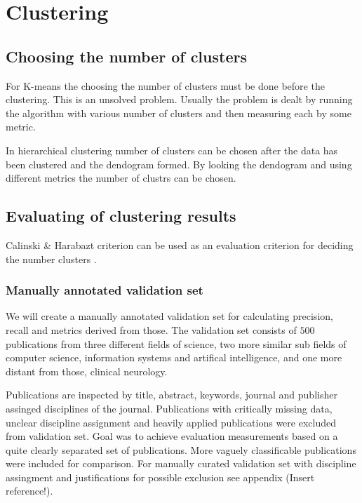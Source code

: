 
\section{Clustering}



\subsection{Choosing the number of clusters}
For K-means the choosing the number of clusters must be done before
the clustering. This is an unsolved problem. 
Usually the 
problem is dealt by running the algorithm with various number of 
clusters and then measuring each by some metric. 

In hierarchical clustering number of clusters can be chosen after 
the data has been clustered and the dendogram formed. 
 By 
looking the dendogram and using different metrics the number of 
clustrs can be chosen.


\subsection{Evaluating of clustering results}
Calinski \& Harabazt criterion can be used as an evaluation 
criterion for deciding the number clusters . 

\subsubsection{Manually annotated validation set}
We will create a manually annotated validation set for calculating
precision, recall and metrics derived from those. The validation
set consists of $500$ publications from three different fields of
science, two more similar sub fields of computer science, 
information systems and artifical intelligence, and one more
distant from those, clinical neurology.

Publications are inspected by title, abstract, keywords, journal
and publisher assinged disciplines of the journal. Publications
with critically missing data, unclear discipline assignment and
heavily applied publications were excluded from validation set.
Goal was to achieve evaluation measurements based on a quite 
clearly separated set of publications. More vaguely classificable
publications were included for comparison. For manually curated 
validation set with discipline assingment and justifications for
possible exclusion see appendix (Insert reference!).


